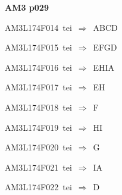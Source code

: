 \par\vfill\eject
{\bf\hfill AM3 p029\hfill\hbox{}}\par\bigskip
{\sixrm AM3L174F014\ {\sixit tei}\ }$\Rightarrow$\ ABCD\par\smallskip
{\sixrm AM3L174F015\ {\sixit tei}\ }$\Rightarrow$\ EFGD\par\smallskip
{\sixrm AM3L174F016\ {\sixit tei}\ }$\Rightarrow$\ EHIA\par\smallskip
{\sixrm AM3L174F017\ {\sixit tei}\ }$\Rightarrow$\ EH\par\smallskip
{\sixrm AM3L174F018\ {\sixit tei}\ }$\Rightarrow$\ F\par\smallskip
{\sixrm AM3L174F019\ {\sixit tei}\ }$\Rightarrow$\ HI\par\smallskip
{\sixrm AM3L174F020\ {\sixit tei}\ }$\Rightarrow$\ G\par\smallskip
{\sixrm AM3L174F021\ {\sixit tei}\ }$\Rightarrow$\ IA\par\smallskip
{\sixrm AM3L174F022\ {\sixit tei}\ }$\Rightarrow$\ D\par\smallskip

